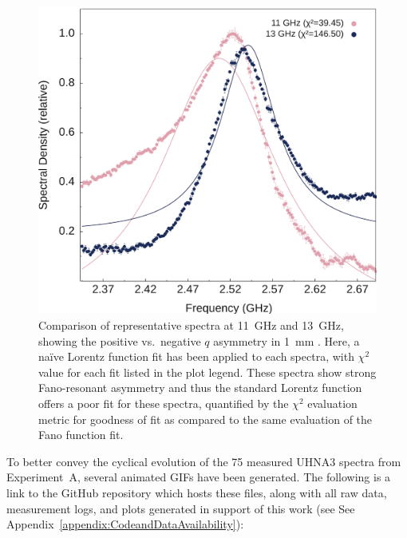 \begin{figure}[ht]
  \centering
  \includegraphics[width=\textwidth]{figs/3-CoBS/CS2LorentzCompare.png}
  \caption[Comparison of representative spectra at \SI{11}{\giga\hertz} and \SI{13}{\giga\hertz}, showing the positive vs.\ negative \(q\) asymmetry in \SI{1}{\milli\meter} , with a naïve Lorentz fit applied.]{Comparison of representative spectra at \SI{11}{\giga\hertz} and \SI{13}{\giga\hertz}, showing the positive vs.\ negative \(q\) asymmetry in \SI{1}{\milli\meter} . Here, a naïve Lorentz function fit has been applied to each spectra, with \(\chi^{2}\) value for each fit listed in the plot legend. These spectra show strong Fano-resonant asymmetry and thus the standard Lorentz function offers a poor fit for these spectra, quantified by the \(\chi^{2}\) evaluation metric for goodness of fit as compared to the same evaluation of the Fano function fit.}
  \label{fig:CS2LorentzCompare}
\end{figure}

\FloatBarrier

To better convey the cyclical evolution of the 75 measured UHNA3 spectra from Experiment~A, several animated GIFs have been generated. The following is a link to the GitHub repository which hosts these files, along with all raw data, measurement logs, and plots generated in support of this work (see See Appendix~\ref{appendix:CodeandDataAvailability}):

